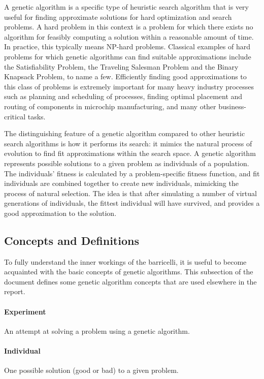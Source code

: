 A genetic algorithm is a specific type of heuristic search algorithm that is very useful for finding approximate solutions for hard optimization and search problems.
A hard problem in this context is a problem for which there exists no algorithm for feasibly computing a solution within a reasonable amount of time.
In practice, this typically means NP-hard problems.
Classical examples of hard problems for which genetic algorithms can find suitable approximations include the Satisfiability Problem, the Traveling Salesman Problem and the Binary Knapsack Problem, to name a few.
Efficiently finding good approximations to this class of problems is extremely important for many heavy industry processes such as planning and scheduling of processes, finding optimal placement and routing of components in microchip manufacturing, and many other business-critical tasks.

The distinguishing feature of a genetic algorithm compared to other heuristic search algorithms is how it performs its search: it mimics the natural process of evolution to find fit approximations within the search space.
A genetic algorithm represents possible solutions to a given problem as individuals of a population.
The individuals' fitness is calculated by a problem-specific fitness function, and fit individuals are combined together to create new individuals, mimicking the process of natural selection.
The idea is that after simulating a number of virtual generations of individuals, the fittest individual will have survived, and provides a good approximation to the solution.

\subsection{Concepts and Definitions}

To fully understand the inner workings of the \Gls{barricelli}, it is useful to become acquainted with the basic concepts of genetic algorithms.
This subsection of the document defines some genetic algorithm concepts that are used elsewhere in the report.

\paragraph{Experiment}
An attempt at solving a problem using a genetic algorithm.

\paragraph{Individual}
One possible solution (good or bad) to a given problem.

